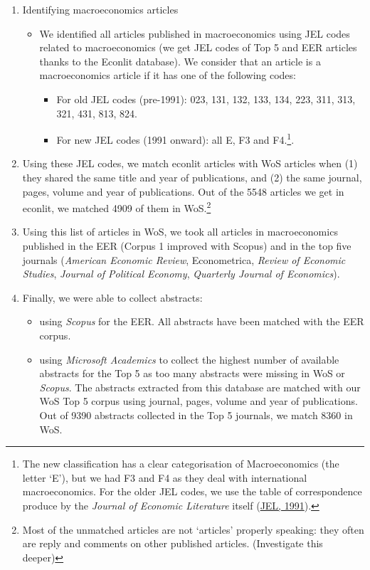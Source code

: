 \documentclass[]{elsarticle} %
\providecommand{\tightlist}{%
  \setlength{\itemsep}{0pt}\setlength{\parskip}{0pt}}
\begin{document}
\begin{enumerate}
\def\labelenumi{\arabic{enumi}.}
\item
  Identifying macroeconomics articles

  \begin{itemize}
  \item
    We identified all articles published in macroeconomics using JEL
    codes related to macroeconomics (we get JEL codes of Top 5 and EER
    articles thanks to the Econlit database). We consider that an
    article is a macroeconomics article if it has one of the following
    codes:

    \begin{itemize}
    \tightlist
    \item
      For old JEL codes (pre-1991): 023, 131, 132, 133, 134, 223, 311,
      313, 321, 431, 813, 824.
    \item
      For new JEL codes (1991 onward): all E, F3 and F4.\footnote{The
        new classification has a clear categorisation of Macroeconomics
        (the letter `E'), but we had F3 and F4 as they deal with
        international macroeconomics. For the older JEL codes, we use
        the table of correspondence produce by the \emph{Journal of
        Economic Literature} itself
        (\protect\hyperlink{ref-jel1991}{JEL, 1991}).}.
    \end{itemize}
  \end{itemize}
\item
  Using these JEL codes, we match econlit articles with WoS articles
  when (1) they shared the same title and year of publications, and (2)
  the same journal, pages, volume and year of publications. Out of the
  5548 articles we get in econlit, we matched 4909 of them in
  WoS.\footnote{Most of the unmatched articles are not `articles'
    properly speaking: they often are reply and comments on other
    published articles. (Investigate this deeper)}
\item
  Using this list of articles in WoS, we took all articles in
  macroeconomics published in the EER (Corpus 1 improved with Scopus)
  and in the top five journals (\emph{American Economic Review},
  Econometrica, \emph{Review of Economic Studies}, \emph{Journal of
  Political Economy}, \emph{Quarterly Journal of Economics}).
\item
  Finally, we were able to collect abstracts:

  \begin{itemize}
  \tightlist
  \item
    using \emph{Scopus} for the EER. All abstracts have been matched
    with the EER corpus.
  \item
    using \emph{Microsoft Academics} to collect the highest number of
    available abstracts for the Top 5 as too many abstracts were missing
    in WoS or \emph{Scopus}. The abstracts extracted from this database
    are matched with our WoS Top 5 corpus using journal, pages, volume
    and year of publications. Out of 9390 abstracts collected in the Top
    5 journals, we match 8360 in WoS.
  \end{itemize}
\end{enumerate}
\end{document}
